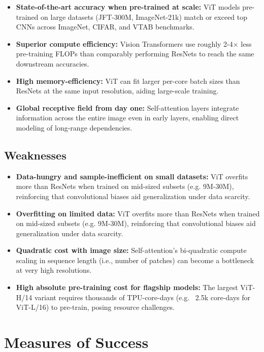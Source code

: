\documentclass[10pt]{article}
\begin{document}
\begin{itemize}
    \item \textbf{State-of-the-art accuracy when pre-trained at scale:} ViT models pre-trained on large datasets (JFT-300M, ImageNet-21k) match or exceed top CNNs across ImageNet, CIFAR, and VTAB benchmarks.
    \item \textbf{Superior compute efficiency:} Vision Transformers use roughly 2-4× less pre-training FLOPs than comparably performing ResNets to reach the same downstream accuracies.
    \item \textbf{High memory-efficiency:} ViT can fit larger per-core batch sizes than ResNets at the same input resolution, aiding large-scale training.
    \item \textbf{Global receptive field from day one:} Self-attention layers integrate information across the entire image even in early layers, enabling direct modeling of long-range dependencies.
\end{itemize}
\subsection*{Weaknesses}
\begin{itemize}

    \item \textbf{Data-hungry and sample-inefficient on small datasets:} ViT overfits more than ResNets when trained on mid-sized subsets (e.g. 9M-30M), reinforcing that convolutional biases aid generalization under data scarcity.
    \item \textbf{Overfitting on limited data:} ViT overfits more than ResNets when trained on mid-sized subsets (e.g. 9M-30M), reinforcing that convolutional biases aid generalization under data scarcity.
    \item \textbf{Quadratic cost with image size:} Self-attention's bi-quadratic compute scaling in sequence length (i.e., number of patches) can become a bottleneck at very high resolutions.
    \item \textbf{High absolute pre-training cost for flagship models:} The largest ViT-H/14 variant requires thousands of TPU-core-days (e.g. ~2.5k core-days for ViT-L/16) to pre-train, posing resource challenges.
\end{itemize}

\section*{Measures of Success}
\end{document}

